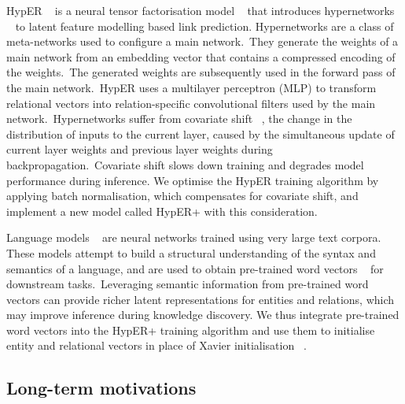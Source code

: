 \noindent HypER \unskip~\citep{balazevic2019hypernetwork} is a neural tensor factorisation model \unskip~\citep{wu2018neural} that introduces hypernetworks \unskip~\citep{ha2016hypernetworks} to latent feature modelling based link prediction. Hypernetworks are a class of meta-networks used to configure a main network.\ They generate the weights of a main network from an embedding vector that contains a compressed encoding of the weights.\ The generated weights are subsequently used in the forward pass of the main network.\ HypER uses a multilayer perceptron (MLP) to transform relational vectors into relation-specific convolutional filters used by the main network.\ Hypernetworks suffer from covariate shift \unskip~\citep{ioffe2015batch}, the change in the distribution of inputs to the current layer, caused by the simultaneous update of current layer weights and previous layer weights during backpropagation.\ Covariate shift slows down training and degrades model performance during inference. We optimise the HypER training algorithm by applying batch normalisation, which compensates for covariate shift, and implement a new model called HypER+ with this consideration. \par

\noindent Language models \unskip~\citep{turian2010word} are neural networks trained using very large text corpora. These models attempt to build a structural understanding of the syntax and semantics of a language, and are used to obtain pre-trained word vectors \unskip~\citep{mikolov2013distributed} for downstream tasks.\ Leveraging semantic information from pre-trained word vectors can provide richer latent representations for entities and relations, which may improve inference during knowledge discovery. We thus integrate pre-trained word vectors into the HypER+ training algorithm and use them to initialise entity and relational vectors in place of Xavier initialisation \unskip~\citep{glorot2010understanding}. 

\subsection{Long-term motivations} 

